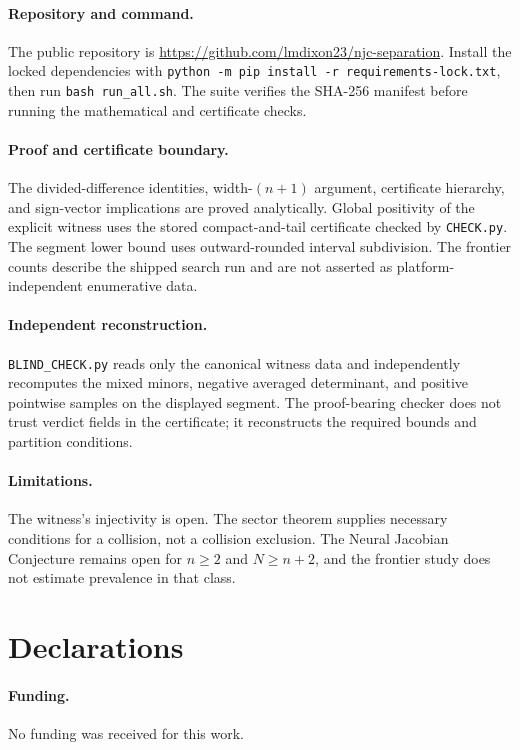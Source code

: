\documentclass[11pt]{article}
\theoremstyle{definition}
\theoremstyle{remark}
\begin{document}
\paragraph{Repository and command.}
The public repository is
\url{https://github.com/lmdixon23/njc-separation}. Install the locked dependencies with
\texttt{python -m pip install -r requirements-lock.txt}, then run
\texttt{bash run\_all.sh}. The suite verifies the SHA-256 manifest before running the mathematical
and certificate checks.

\paragraph{Proof and certificate boundary.}
The divided-difference identities, width-$(n+1)$ argument, certificate hierarchy, and sign-vector
implications are proved analytically. Global positivity of the explicit witness uses the stored
compact-and-tail certificate checked by \texttt{CHECK.py}. The segment lower bound uses
outward-rounded interval subdivision. The frontier counts describe the shipped search run and are
not asserted as platform-independent enumerative data.

\paragraph{Independent reconstruction.}
\texttt{BLIND\_CHECK.py} reads only the canonical witness data and independently recomputes the mixed
minors, negative averaged determinant, and positive pointwise samples on the displayed segment. The
proof-bearing checker does not trust verdict fields in the certificate; it reconstructs the required
bounds and partition conditions.

\paragraph{Limitations.}
The witness's injectivity is open. The sector theorem supplies necessary conditions for a collision,
not a collision exclusion. The Neural Jacobian Conjecture remains open for $n\ge2$ and
$N\ge n+2$, and the frontier study does not estimate prevalence in that class.

\section*{Declarations}
\paragraph{Funding.} No funding was received for this work.
\end{document}
